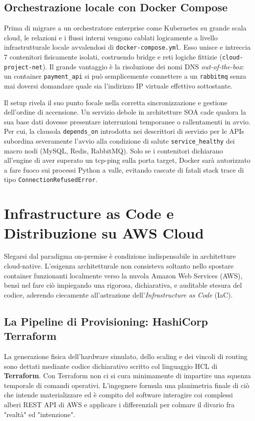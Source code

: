 \documentclass[11pt,a4paper]{report}
\begin{document}
\section{Orchestrazione locale con Docker Compose}
Prima di migrare a un orchestratore enterprise come Kubernetes su grande scala cloud, le relazioni e i flussi interni vengono cablati logicamente a livello infrastrutturale locale avvalendosi di \texttt{docker-compose.yml}. 
Esso unisce e intreccia 7 contenitori fisicamente isolati, costruendo bridge e reti logiche fittizie (\texttt{cloud-project-net}). Il grande vantaggio \`e la risoluzione dei nomi DNS \textit{out-of-the-box}: un container \texttt{payment\_api} si pu\`o semplicemente connettere a un \texttt{rabbitmq} senza mai doversi domandare quale sia l'indirizzo IP virtuale effettivo sottostante.

Il setup rivela il suo punto focale nella corretta sincronizzazione e gestione dell'ordine di accensione. Un servizio debole in architetture SOA cade qualora la sua base dati dovesse presentare interruzioni temporanee o rallentamenti in avvio. Per cui, la clausola \texttt{depends\_on} introdotta nei descrittori di servizio per le APIs subordina severamente l'avvio alla condizione di salute \texttt{service\_healthy} dei macro nodi (MySQL, Redis, RabbitMQ). Solo se i contenitori dichiarano all'engine di aver superato un tcp-ping sulla porta target, Docker sar\`a autorizzato a fare fuoco sui processi Python a valle, evitando cascate di fatali stack trace di tipo \texttt{ConnectionRefusedError}.

\chapter{Infrastructure as Code e Distribuzione su AWS Cloud}

Slegarsi dal paradigma on-premise \`e condizione indispensabile in architetture cloud-native. L'esigenza architetturale non consisteva soltanto nello spostare container funzionanti localmente verso la nuvola Amazon Web Services (AWS), bens\`i nel fare ci\`o impiegando una rigorosa, dichiarativa, e auditable stesura del codice, aderendo ciecamente all'astrazione dell'\textit{Infrastructure as Code} (IaC).

\section{La Pipeline di Provisioning: HashiCorp Terraform}
La generazione fisica dell'hardware simulato, dello scaling e dei vincoli di routing sono dettati mediante codice dichiarativo scritto col linguaggio HCL di \textbf{Terraform}. 
Con Terraform non ci si cura minimamente di impartire una squenza temporale di comandi operativi. L'ingegnere formula una planimetria finale di ci\`o che intende materializzare ed \`e compito del software interagire coi complessi alberi REST API di AWS e applicare i differenziali per colmare il divario fra "realt\`a" ed "intenzione".
\end{document}
